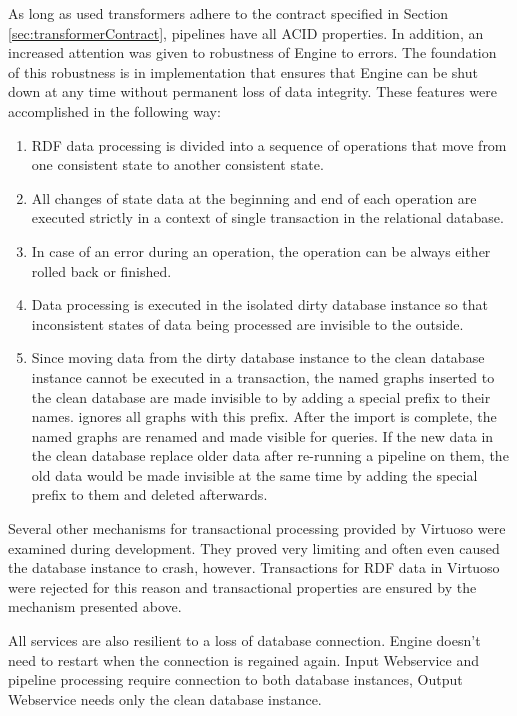 As long as used transformers adhere to the contract specified in Section \ref{sec:transformerContract}, pipelines have all ACID properties. In addition, an increased attention was given to robustness of Engine to errors. The foundation of this robustness is in implementation that ensures that Engine can be shut down at any time without permanent loss of data integrity. These features were accomplished in the following way:
\begin{enumerate}
  \item RDF data processing is divided into a sequence of operations that move from one consistent state to another consistent state.
  \item All changes of state data at the beginning and end of each operation are executed strictly in a context of single transaction in the relational database.
  \item In case of an error during an operation, the operation can be always either rolled back or finished.
  \item Data processing is executed in the isolated dirty database instance so that inconsistent states of data being processed are invisible to the outside. 
  \item \label{itm:enginePrefix} Since moving data from the dirty database instance to the clean database instance cannot be executed in a transaction, the named graphs inserted to the clean database are made invisible to \QE by adding a special prefix to their names. \QE ignores all graphs with this prefix. After the import is complete, the named graphs are renamed and made visible for queries. If the new data in the clean database replace older data after re-running a pipeline on them, the old data would be made invisible at the same time by adding the special prefix to them and deleted afterwards.
\end{enumerate}

Several other mechanisms for transactional processing provided by Virtuoso were examined during development. They proved very limiting and often even caused the database instance to crash, however. Transactions for RDF data in Virtuoso were rejected for this reason and transactional properties are ensured by the mechanism presented above.    

All services are also resilient to a loss of database connection. Engine doesn't need to restart when the connection is regained again. Input Webservice and pipeline processing require connection to both database instances, Output Webservice needs only the clean database instance.

